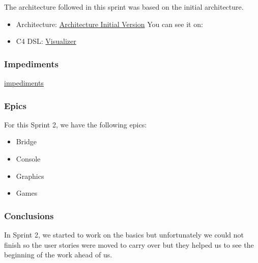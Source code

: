 The architecture followed in this sprint was based on the initial architecture.

\begin{itemize}
    \item Architecture: \href{https://github.com/Pending-Name-21/arquitecture/pull/1/files}{Architecture Initial Version}
    You can see it on: 
    \item C4 DSL: \href{https://structurizr.com/dsl}{Visualizer}
\end{itemize}

\subsubsection{Impediments}
\href{https://docs.google.com/spreadsheets/d/1ty_hOe11I5BHMMoJYUfMxHD2sC9OoST2Nor8Q2Cqvq0/edit?usp=sharing}{impediments}

\subsubsection{Epics}
For this Sprint 2, we have the following epics:

\begin{itemize}
    \item Bridge
    \item Console
    \item Graphics
    \item Games
\end{itemize}




\subsubsection{Conclusions}

In Sprint 2, we started to work on the basics but unfortunately 
we could not finish so the user stories were moved to carry over 
but they helped us to see the beginning of the work ahead of us.
